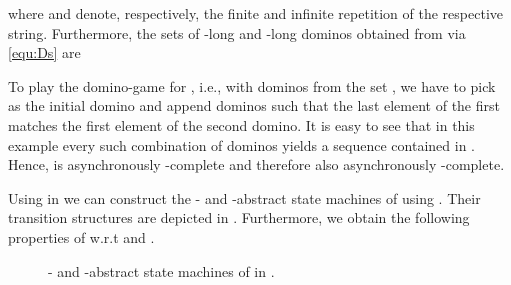   where  and  denote, respectively, the finite and infinite repetition of the respective string. Furthermore, the sets of -long and -long dominos obtained from  via \eqref{equ:Ds} are
  
  To play the domino-game for , i.e., with dominos from the set , we have to pick  as the initial domino and append dominos such that the last element of the first matches the first element of the second domino. It is easy to see that in this example every such combination of dominos yields a sequence contained in . Hence,  is asynchronously -complete and therefore also asynchronously -complete.
  


Using  in  we can construct the - and  -abstract state machines of  using . Their transition structures are depicted in . Furthermore, we obtain the following properties of  w.r.t  and .


 \begin{figure}
  \begin{center}
   \end{center}
  \caption{- and -abstract state machines of  in .}\label{fig:exp_Qsysa1}
 \end{figure}

